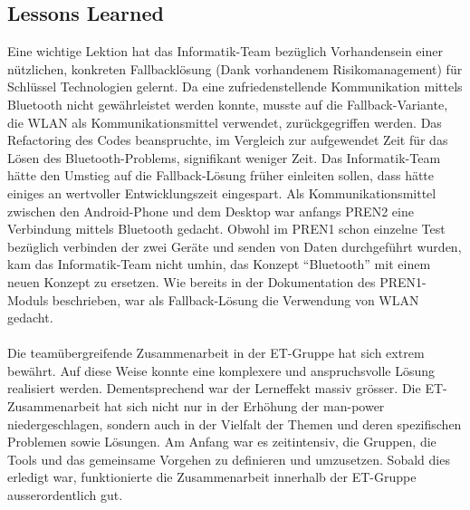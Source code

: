 \subsection{Lessons Learned}
Eine wichtige Lektion hat das Informatik-Team bezüglich Vorhandensein einer nützlichen, 
konkreten Fallbacklösung (Dank vorhandenem Risikomanagement) für Schlüssel Technologien gelernt. 
Da eine zufriedenstellende Kommunikation mittels Bluetooth nicht gewährleistet werden konnte, 
musste auf die Fallback-Variante, die WLAN als Kommunikationsmittel verwendet, zurückgegriffen werden. 
Das Refactoring des Codes beanspruchte, im Vergleich zur aufgewendet Zeit für das Lösen des Bluetooth-Problems, 
signifikant weniger Zeit. Das Informatik-Team hätte den Umstieg auf die Fallback-Lösung früher einleiten sollen, 
dass hätte einiges an wertvoller Entwicklungszeit eingespart.
\newline
\newline
Als Kommunikationsmittel zwischen den Android-Phone und dem Desktop war anfangs PREN2 eine Verbindung 
mittels Bluetooth gedacht. Obwohl im PREN1 schon einzelne Test bezüglich verbinden der zwei Geräte und 
senden von Daten durchgeführt wurden, kam das Informatik-Team nicht umhin, das Konzept \enquote{Bluetooth} mit einem neuen 
Konzept zu ersetzen. Wie bereits in der Dokumentation des PREN1-Moduls beschrieben, war als Fallback-Lösung 
die Verwendung von WLAN gedacht. 
\\
\\
Die teamübergreifende Zusammenarbeit in der ET-Gruppe hat sich extrem bewährt.  Auf diese Weise 
konnte eine komplexere und anspruchsvolle Lösung realisiert werden. Dementsprechend war der 
Lerneffekt massiv grösser. Die ET-Zusammenarbeit hat sich nicht nur in der Erhöhung der man-power 
niedergeschlagen, sondern auch in der Vielfalt der Themen und deren spezifischen Problemen sowie 
Lösungen. Am Anfang war es zeitintensiv, die Gruppen, die Tools und das gemeinsame Vorgehen zu 
definieren und umzusetzen. Sobald dies erledigt war, funktionierte die Zusammenarbeit innerhalb 
der ET-Gruppe ausserordentlich gut.